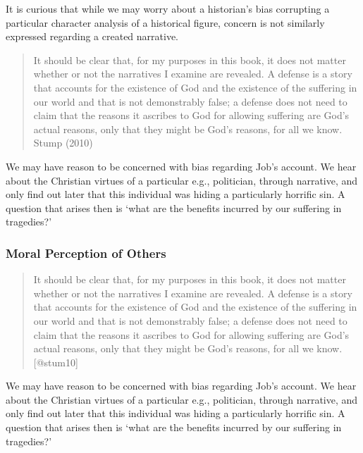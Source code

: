 \documentclass[
  letterpaper,
  DIV=11,
  numbers=noendperiod]{scrartcl}
\theoremstyle{remark}
\begin{document}
It is curious that while we may worry about a historian's bias
corrupting a particular character analysis of a historical figure,
concern is not similarly expressed regarding a created narrative.

\begin{quote}
It should be clear that, for my purposes in this book, it does not
matter whether or not the narratives I examine are revealed. A defense
is a story that accounts for the existence of God and the existence of
the suffering in our world and that is not demonstrably false; a defense
does not need to claim that the reasons it ascribes to God for allowing
suffering are God's actual reasons, only that they might be God's
reasons, for all we know. Stump (2010)
\end{quote}

We may have reason to be concerned with bias regarding Job's account. We
hear about the Christian virtues of a particular e.g., politician,
through narrative, and only find out later that this individual was
hiding a particularly horrific sin. A question that arises then is `what
are the benefits incurred by our suffering in tragedies?'

\subsubsection{Moral Perception of
Others}\label{moral-perception-of-others}

\begin{quote}
It should be clear that, for my purposes in this book, it does not
matter whether or not the narratives I examine are revealed. A defense
is a story that accounts for the existence of God and the existence of
the suffering in our world and that is not demonstrably false; a defense
does not need to claim that the reasons it ascribes to God for allowing
suffering are God's actual reasons, only that they might be God's
reasons, for all we know. {[}@stum10{]}
\end{quote}

We may have reason to be concerned with bias regarding Job's account. We
hear about the Christian virtues of a particular e.g., politician,
through narrative, and only find out later that this individual was
hiding a particularly horrific sin. A question that arises then is `what
are the benefits incurred by our suffering in tragedies?'
\end{document}
